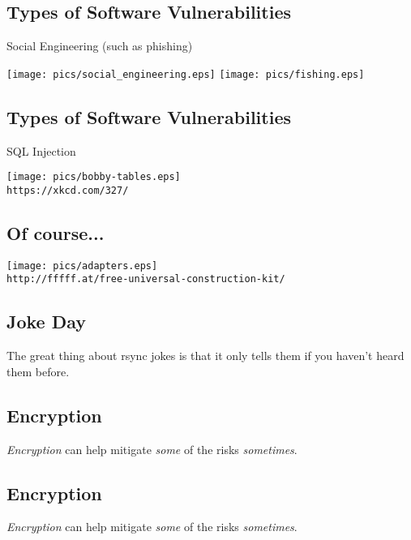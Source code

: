 \documentclass[xga]{xdvislides}
\begin{document}
\subsection{Types of Software Vulnerabilities}
Social Engineering (such as phishing)
\begin{center}
	\texttt{[image: pics/social\_engineering.eps]}
	\texttt{[image: pics/fishing.eps]}
\end{center}

\subsection{Types of Software Vulnerabilities}
SQL Injection
\begin{center}
	\texttt{[image: pics/bobby-tables.eps]} \\
	\verb+https://xkcd.com/327/+
\end{center}


\subsection{Of course...}
\vspace*{\fill}
\begin{center}
	\texttt{[image: pics/adapters.eps]}  \\
	\verb+http://fffff.at/free-universal-construction-kit/+ \\
\end{center}
\vspace*{\fill}

\subsection{Joke Day}
\vspace*{\fill}
\begin{center}
\Huge
The great thing about rsync jokes is that it only tells them if you
haven't heard them before.
\Normalsize
\end{center}
\vspace*{\fill}


\subsection{Encryption}
{\em Encryption} can help mitigate {\em some} of the risks {\em sometimes}.

\subsection{Encryption}
{\em Encryption} can help mitigate {\em some} of the risks {\em sometimes}.
\\
\end{document}

